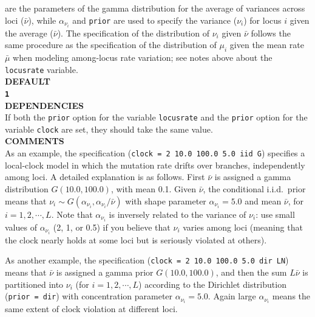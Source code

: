 \documentclass[a4paper]{book}
\numberwithin{equation}{section} \renewcommand{\baselinestretch}{0.55}
\begin{document}
are the parameters of the gamma distribution for the average of
variances across loci ($\bar\nu$), while $\alpha_{\nu_i}$ and
\texttt{prior} are used to specify the variance ($\nu_i$) for locus
$i$ given the average ($\bar\nu$).  The specification of the
distribution of $\nu_i$ given $\bar\nu$ follows the same procedure as
the specification of the distribution of $\mu_i$ given the mean rate
$\bar\mu$ when modeling among-locus rate variation; see notes above
about the \texttt{locusrate} variable.
\vspace{5pt}\\
\textbf{DEFAULT} \vspace{5pt}\\
\textbf{\texttt{1}} \vspace{5pt}\\
\textbf{DEPENDENCIES} \vspace{5pt}\\
If both the \texttt{prior} option for the variable \texttt{locusrate}
and the \texttt{prior} option
for the variable \texttt{clock} are set, they should take the same value.  \vspace{5pt} \\
\textbf{COMMENTS} \vspace{5pt}\\
As an example, the specification (\texttt{clock = 2 10.0 100.0 5.0 iid
  G}) specifies a local-clock model in which the mutation rate drifts
over branches, independently among loci. A detailed explanation is as
follows.  First $\bar\nu$ is assigned a gamma distribution
$G(10.0, 100.0)$, with mean 0.1.  Given $\bar\nu$, the conditional
i.i.d.\ prior means that
$\nu_i \sim G(\alpha_{\nu_i}, \alpha_{\nu_i}/\bar\nu)$ with shape
parameter $\alpha_{\nu_i} = 5.0$ and mean $\bar\nu$, for
$i = 1, 2, \cdots, L$.  Note that $\alpha_{\nu_i}$ is inversely
related to the variance of $\nu_i$: use small values of
$\alpha_{\nu_i}$ (2, 1, or 0.5) if you believe that $\nu_i$ varies
among loci (meaning that the clock nearly holds at some loci but is
seriously violated at others).

As another example, the specification (\texttt{clock = 2 10.0 100.0
  5.0 dir LN}) means that $\bar\nu$ is assigned a gamma prior
$G(10.0, 100.0)$, and then the sum $L\bar\nu$ is partitioned into
$\nu_i$ (for $i = 1, 2, \cdots, L$) according to the Dirichlet
distribution (\texttt{prior = dir}) with concentration parameter
$\alpha_{\nu_i} = 5.0$.  Again large $\alpha_{\nu_i}$ means the same
extent of clock violation at different loci.
\end{document}
